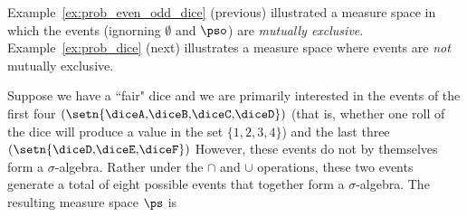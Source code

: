 Example~\ref{ex:prob_even_odd_dice} (previous) illustrated a
measure space in which the events (ignorning $\emptyset$ and $\pso$)
are {\em mutually exclusive}.
Example~\ref{ex:prob_dice} (next) illustrates a measure space
where events are {\em not} mutually exclusive.
\begin{example}
\label{ex:prob_dice}
Suppose we have a ``fair" dice and we are primarily interested in the
events of the first four
$\left(\setn{\text{\diceA,\diceB,\diceC,\diceD}}\right)$
(that is, whether one roll of the dice will produce
a value in the set $\{1,2,3,4\}$)
and the last three
$\left(\setn{\text{\diceD,\diceE,\diceF}}\right)$
However, these events do not by themselves form a $\sigma$-algebra.
Rather under the $\cap$ and $\cup$ operations, these two events generate
a total of eight possible events that together form a $\sigma$-algebra.
The resulting measure space $\ps$ is
\end{example}

